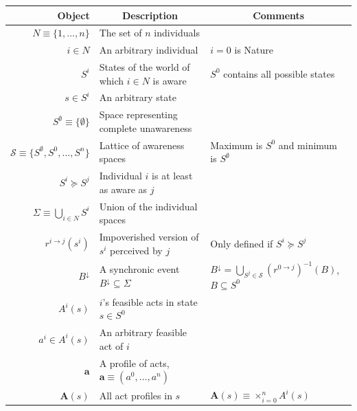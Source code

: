 \documentclass[
11pt,
titlepage,
reqno,
]{article}%
\theoremstyle{definition}
\begin{document}
\begin{table}\centering
{}
\begin{tabular}{@{}rll@{}}\toprule
Object                                             & \multicolumn{1}{c}{Description}                       & \multicolumn{1}{c}{Comments}\\ \midrule
$N\equiv \{1,\dots,n\}$                            & The set of $n$ individuals                            & \\
$i\in N$                                           & An arbitrary individual                               & $i=0$ is Nature\\
$S^i$                                              & States of the world of which $i\in N$ is aware        & $S^0$ contains all possible states\\
$s\in S^i$                                         & An arbitrary state                                    & \\
$S^\emptyset\equiv\{\emptyset\}$                   & Space representing complete unawareness               & \\
$\mathcal{S}\equiv \{S^\emptyset,S^0,\ldots,S^n\}$ & Lattice of awareness spaces                           & Maximum is $S^0$ and minimum is $S^\emptyset$\\
$S^i\succeq S^j$                                   & Individual $i$ is at least as aware as $j$            & \\
$\Sigma\equiv\bigcup_{i\in N}S^i$                  & Union of the individual spaces                        & \\
$r^{i\rightarrow j}(s^i)$                          & Impoverished version of $s^i$ perceived by $j$        & Only defined if  $S^i\succeq S^j$\\
$B^{\downarrow}$                                   & A synchronic event $B^{\downarrow}\subseteq \Sigma$   & $B^{\downarrow}=\bigcup_{S^j\in \mathcal{S}}\left(r^{0\rightarrow j}\right)^{-1}(B)$, $B\subseteq S^0$\\
$A^i(s)$                                           & $i$'s feasible acts in state $s\in S^0$               & \\
$a^i\in A^i(s)$                                    & An arbitrary feasible act of $i$                      & \\
$\mathbf{a}$                                       & A profile of acts, $\mathbf{a}\equiv(a^0,\ldots,a^n)$ & \\
$\mathbf{A}(s)$                                    & All act profiles in $s$                               & $\mathbf{A}(s)\equiv \times_{i=0}^n A^i(s)$\\

\end{tabular}
\end{table}
\end{document}
